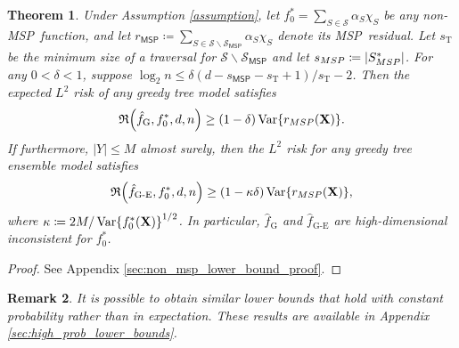 \documentclass[11pt]{article}
\newtheorem{theorem}{Theorem}[section]
\newtheorem{remark}[theorem]{Remark}
\newcommand{\bX}{\mathbf{X}}
\DeclarePairedDelimiter{\braces}{\lbrace}{\rbrace}
\DeclarePairedDelimiter{\paren}{(}{)}
\DeclarePairedDelimiter{\abs}{|}{|}
\newcommand{\Var}{\operatorname{Var}}
\newcommand{\sparsity}{s}
\newcommand{\nfeats}{d}
\newcommand{\nsamples}{n}
\newcommand{\MSP}{\textsf{MSP}}
\newcommand{\suppset}{S^*}
\newcommand{\fgreedy}{\hat{f}_{\operatorname{G}}}
\newcommand{\monomial}{\chi}
\newcommand{\fcoefs}{\mathcal{S}}
\newcommand{\objective}{\mathfrak{R}}
\newcommand{\fgre}{\hat f_{\operatorname{G-E}}}
\newcommand{\ybound}{M}
\newcommand{\traversalsize}{\sparsity_{\operatorname{T}}}
\begin{document}
\begin{theorem}
    \label{thm:non_msp_lower_bound}
    Under Assumption \ref{assumption}, let $f_0^* = \sum_{S \in \fcoefs} \alpha_S\monomial_S$ be any non-\MSP~function, and let $r_{\MSP} \coloneqq \sum_{S\in \fcoefs\backslash\fcoefs_{\MSP}}\alpha_S\monomial_S$ denote its \MSP~residual.
    Let $\traversalsize$ be the minimum size of a traversal for $\fcoefs\backslash\fcoefs_{\MSP}$ and let $\sparsity_{\MSP} \coloneqq \abs*{\suppset_{\MSP}}$.
    For any $0 < \delta < 1$,
    suppose $\log_2\nsamples \leq \delta(\nfeats-\sparsity_{\MSP}-\traversalsize+1)/\traversalsize - 2$.
    Then the expected $L^2$ risk of any greedy tree model satisfies
    \begin{equation}
        \objective\paren*{\fgreedy, f^*_0,\nfeats,\nsamples} \geq (1-\delta)\Var\braces*{r_{\MSP}(\bX)}.
    \end{equation}
    If furthermore, $|Y| \leq \ybound$ almost surely, 
    then the $L^2$ risk for any greedy tree ensemble model satisfies
    \begin{equation}
    \label{eq:nonmsp_ensemble_lower_bound}
        \objective\paren*{\fgre, f^*_0,\nfeats,\nsamples} \geq (1-\kappa\delta)\Var\braces*{r_{\MSP}(\bX)},
    \end{equation}
    where $\kappa \coloneqq 2\ybound/\Var\braces*{f_0^*(\bX)}^{1/2}$.
    In particular, $\fgreedy$ and $\fgre$ are high-dimensional inconsistent for $f^*_0$.
\end{theorem}

\begin{proof}
    See Appendix \ref{sec:non_msp_lower_bound_proof}.
\end{proof}




\begin{remark}
    It is possible to obtain similar lower bounds that hold with constant probability rather than in expectation.
    These results are available in Appendix \ref{sec:high_prob_lower_bounds}.
\end{remark}
\end{document}
